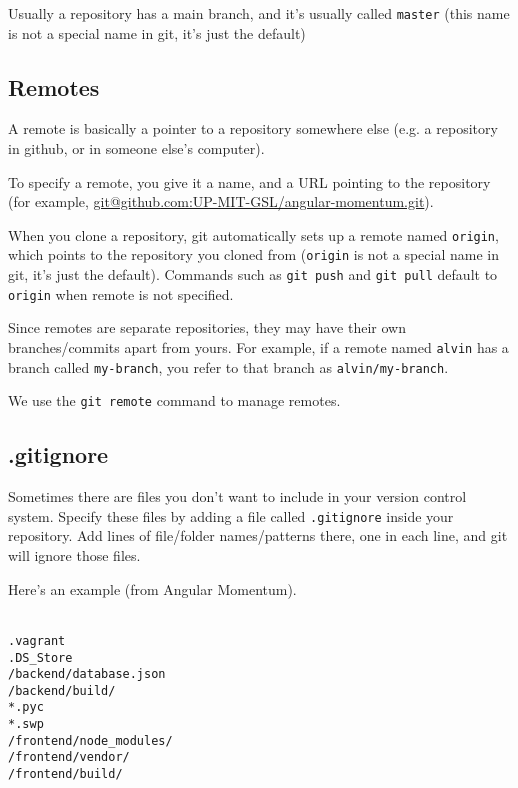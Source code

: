 \documentclass[12pt]{article}
\begin{document}
Usually a repository has a main branch, and it's usually called \texttt{master} (this name is not a special name in git, it's just the default)

\subsection{Remotes}
A remote is basically a pointer to a repository somewhere else (e.g. a repository in github, or in someone else's computer).

To specify a remote, you give it a name, and a URL pointing to the repository (for example, \url{git@github.com:UP-MIT-GSL/angular-momentum.git}).

When you clone a repository, git automatically sets up a remote named \texttt{origin}, which points to the repository you cloned from (\texttt{origin} is not a special name in git, it's just the default). Commands such as \texttt{git push} and \texttt{git pull} default to \texttt{origin} when remote is not specified.

Since remotes are separate repositories, they may have their own branches/commits apart from yours. For example, if a remote named \texttt{alvin} has a branch called \texttt{my-branch}, you refer to that branch as \texttt{alvin/my-branch}.

We use the \texttt{git remote} command to manage remotes.

\subsection{.gitignore}
Sometimes there are files you don't want to include in your version control system. Specify these files by adding a file called \texttt{.gitignore} inside your repository. Add lines of file/folder names/patterns there, one in each line, and git will ignore those files.

Here's an example (from Angular Momentum).

\texttt{\\
.vagrant\\
.DS\_Store\\
/backend/database.json\\
/backend/build/\\
*.pyc\\
*.swp\\
/frontend/node\_modules/\\
/frontend/vendor/\\
/frontend/build/
}
\end{document}
